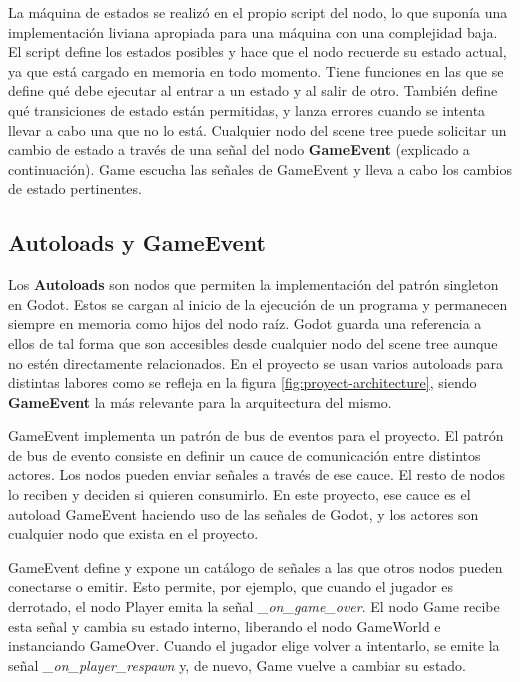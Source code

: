 La máquina de estados se realizó en el propio script del nodo, lo que suponía una implementación liviana apropiada para una máquina con una complejidad baja. El script define los estados posibles y hace que el nodo recuerde su estado actual, ya que está cargado en memoria en todo momento. Tiene funciones en las que se define qué debe ejecutar al entrar a un estado y al salir de otro. También define qué transiciones de estado están permitidas, y lanza errores cuando se intenta llevar a cabo una que no lo está. Cualquier nodo del scene tree puede solicitar un cambio de estado a través de una señal del nodo \textbf{GameEvent} (explicado a continuación). Game escucha las señales de GameEvent y lleva a cabo los cambios de estado pertinentes.

\subsection{Autoloads y GameEvent}

Los \textbf{Autoloads} son nodos que permiten la implementación del patrón singleton en Godot. Estos se cargan al inicio de la ejecución de un programa y permanecen siempre en memoria como hijos del nodo raíz. Godot guarda una referencia a ellos de tal forma que son accesibles desde cualquier nodo del scene tree aunque no estén directamente relacionados. En el proyecto se usan varios autoloads para distintas labores como se refleja en la figura \ref{fig:proyect-architecture}, siendo \textbf{GameEvent} la más relevante para la arquitectura del mismo.

GameEvent implementa un patrón de bus de eventos para el proyecto. El patrón de bus de evento consiste en definir un cauce de comunicación entre distintos actores. Los nodos pueden enviar señales a través de ese cauce. El resto de nodos lo reciben y deciden si quieren consumirlo. En este proyecto, ese cauce es el autoload GameEvent haciendo uso de las señales de Godot, y los actores son cualquier nodo que exista en el proyecto.

GameEvent define y expone un catálogo de señales a las que otros nodos pueden conectarse o emitir. Esto permite, por ejemplo, que cuando el jugador es derrotado, el nodo Player emita la señal \textit{\_on\_game\_over}. El nodo Game recibe esta señal y cambia su estado interno, liberando el nodo GameWorld e instanciando GameOver. Cuando el jugador elige volver a intentarlo, se emite la señal \textit{\_on\_player\_respawn} y, de nuevo, Game vuelve a cambiar su estado.

